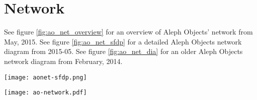 %
%
%
%
%

\section{Network}
See figure \ref{fig:ao_net_overview} for an overview of Aleph Objects' network from May, 2015.
See figure \ref{fig:ao_net_sfdp} for a detailed Aleph Objects network diagram from 2015-05.
See figure \ref{fig:ao_net_dia} for an older Aleph Objects network diagram from February, 2014.




\begin{sidewaysfigure}[p]
\texttt{[image: aonet-sfdp.png]}
 \caption{Aleph Objects Network Detail, May 2015}
 \label{fig:ao_net_sfdp}
\end{sidewaysfigure}

\begin{sidewaysfigure}[p]
\texttt{[image: ao-network.pdf]}
 \caption{Aleph Objects Network Diagram, February 2014}
 \label{fig:ao_net_dia}
\end{sidewaysfigure}

